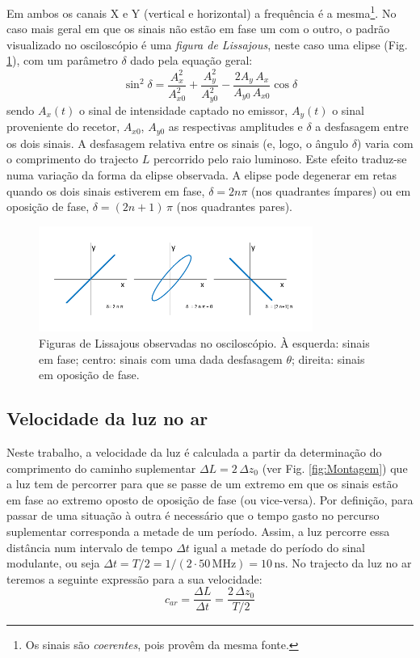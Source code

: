 \documentclass[a4paper,twoside,11pt]{report}      %
\begin{document}
Em ambos os canais X e Y (vertical e horizontal) a frequência é a mesma\footnote{Os sinais são \emph{coerentes}, pois provêm da mesma fonte.}. No caso mais geral em que os sinais não estão em fase um com o outro, o padrão visualizado no osciloscópio é uma \emph{figura de Lissajous}, neste caso uma elipse (Fig. \ref{fig:fase}), com um parâmetro $\delta$ dado pela equação geral:
\begin{equation}
	\label{eq:elipse}
	\sin^2 \delta = \frac{A_x^2}{A_{x0}^2} + \frac{A_y^2}{A_{y0}^2} - \frac{2 A_y\,A_x}{A_{y0}\,A_{x0}} \cos  \delta
\end{equation}
sendo $A_x(t)$ o sinal de intensidade captado no emissor,  $A_y(t)$ o sinal
proveniente do recetor, $A_{x0}$, $A_{y0}$ as respectivas amplitudes e $\delta$ a desfasagem entre os dois sinais. A desfasagem relativa entre os sinais (e, logo, o ângulo $\delta$) varia com o comprimento do trajecto $L$ percorrido pelo raio luminoso. Este efeito traduz-se numa variação da forma da elipse observada.  A elipse pode degenerar em retas quando os dois sinais estiverem em fase, $\delta = 2n\pi$ (nos quadrantes ímpares)  ou em oposição de fase, $\delta = (2n+1)\,\pi$ (nos quadrantes pares). 

\begin{figure}
	[htb]  \centering 
	\includegraphics[width=0.8\textwidth]{osci_fase}
	\caption{Figuras de Lissajous observadas no osciloscópio. À esquerda: sinais em fase; centro: sinais com uma dada desfasagem $\theta$; direita: sinais em oposição de fase.  \label{fig:fase}} 
\end{figure}

\subsection{\sf Velocidade da luz no ar}
Neste trabalho, a velocidade da luz é calculada a partir da determinação do comprimento do
caminho suplementar $\Delta L= 2\,\Delta z_0$ (ver Fig. \ref{fig:Montagem}) que a luz tem de percorrer para que se passe de um extremo em que os sinais estão em fase ao extremo oposto de oposição de fase (ou vice-versa). Por definição, para passar de uma situação à outra é necessário que o tempo gasto no percurso suplementar corresponda a metade de um período. Assim, a luz percorre essa distância num intervalo de tempo $\Delta t$ igual a metade do período do sinal modulante, ou seja $\Delta t=T/2=1/(2\cdot50\,\textrm{MHz})= 10\,\textrm{ns}$. 
No trajecto da luz no ar teremos a seguinte expressão para a sua velocidade:
\begin{equation}
	\label{eq:vc}
	c_{ar} = \frac{\Delta L}{\Delta t}=\frac{2\,\Delta z_0}{T/2} 
\end{equation}
\end{document}
